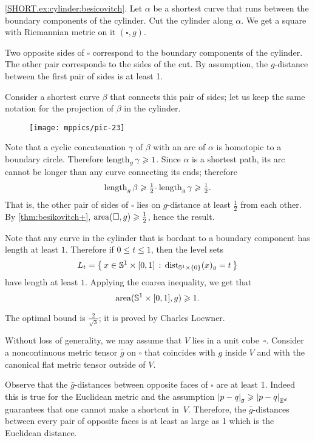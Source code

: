 \parbf{\ref{ex:cylinder};} \ref{SHORT.ex:cylinder:besicovitch}.
Let $\alpha$ be a shortest curve that runs between the boundary components of the cylinder.
Cut the cylinder along $\alpha$.
We get a square with Riemannian metric on it $(\square,g)$.

Two opposite sides of $\square$ correspond to the boundary components of the cylinder.
The other pair corresponds to the sides of the cut.
By assumption, the $g$-distance between the first pair of sides is at least 1.

Consider a shortest curve $\beta$ that connects this pair of sides;
let us keep the same notation for the projection of $\beta$ in the cylinder.

\begin{wrapfigure}{o}{45 mm}
\vskip2mm
\centering
\texttt{[image: mppics/pic-23]}
\end{wrapfigure}

Note that a cyclic concatenation $\gamma$ of $\beta$ with an arc of $\alpha$ is homotopic to a boundary circle.
Therefore $\mathop{\rm length}\nolimits_g\gamma\geqslant1$.
Since $\alpha$ is a shortest path, its arc cannot be longer than any curve connecting its ends; therefore 
\[\length_g\beta\ge \tfrac 12\cdot\length_g \gamma\ge \tfrac 12.\]
That is, the other pair of sides of $\square$ lies on $g$-distance at least $\tfrac12$ from each other.
By \ref{thm:besikovitch+}, $\operatorname{\rm area}\nolimits(\square,g)\geqslant \tfrac12$, hence the result.

Note that any curve in the cylinder that is bordant to a boundary component has length at least $1$.
Therefore if $0\le t\le  1$, then the level sets 
\[L_t=\left\{\,{x\in \mathbb{S}^1\times[0,1]}\,:\,{\mathrm{dist}_{\mathbb{S}^1\times\{0\}}(x)_{g}=t}\,\right\}\] have length at least $1$.
Applying the coarea inequality, we get that
\[\operatorname{\rm area}\nolimits(\mathbb{S}^1\times[0,1],g)\geqslant 1.\]

The optimal bound is $\tfrac2{\sqrt{3}}$;
it is proved by Charles Loewner.

Without loss of generality, we may assume that $V$ lies in a unit cube~$\square$.
Consider a noncontinuous metric tensor $\bar g$ on $\square$ that coincides with $g$ inside $V$ and with the canonical flat metric tensor outside of $V$.

Observe that the $\bar g$-distances between opposite faces of $\square$ are at least 1.
Indeed this is true for the Euclidean metric and the assumption $\dist{p}{q}{g}\ge\dist{p}{q}{\EE^d}$  guarantees that one cannot make a shortcut in~$V$.
Therefore, the $\bar g$-distances between every pair of opposite faces is at least as large as 1 which is the Euclidean distance.

